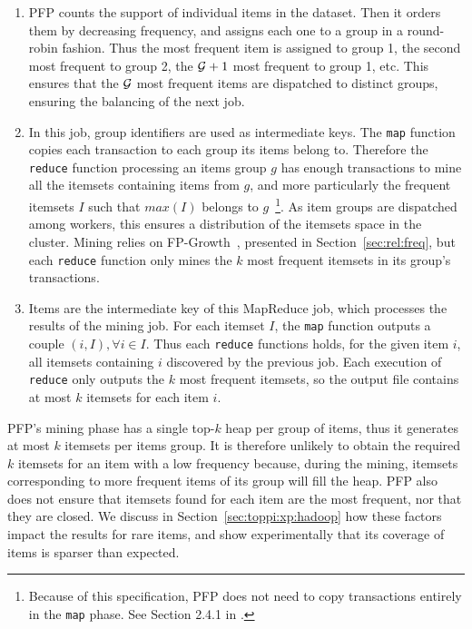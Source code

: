 {
\renewcommand{\labelenumi}{Job \circled{\theenumi}}
\begin{enumerate}
	\leftskip .2in
	\item PFP counts the support of individual items in the dataset.
	Then it orders them by decreasing frequency,
	and assigns each one to a group in a round-robin fashion.
	Thus the most frequent item is assigned to group 1,
	the second most frequent to group 2,
	the ${\cal G}+1$ most frequent to group 1, etc.
	This ensures that the $\cal G$ most frequent items are dispatched to distinct groups,
	ensuring the balancing of the next job.

	\item In this job, group identifiers are used as intermediate keys.
	The \verb|map| function copies each transaction to each group its items belong to.
	Therefore the \verb|reduce| function processing an items group $g$ has enough transactions to mine
	all the itemsets containing items from $g$,
	and more particularly
	the frequent itemsets $I$ such that $\mathit{max}(I)$ belongs to $g$~\footnote{
	Because of this specification, PFP does not need to copy transactions entirely in the \verb|map| phase.
	See Section 2.4.1 in \cite{LiRecSys08}.
	}. As item groups are dispatched among workers,
	this ensures a distribution of the itemsets space in the cluster.
	Mining relies on FP-Growth~\cite{HanSIGMOD00}, presented in Section~\ref{sec:rel:freq},
	but each \verb|reduce| function only mines the $k$ most frequent itemsets in its group's transactions.

	\item Items are the intermediate key of this MapReduce job,
	which processes the results of the mining job.
	For each itemset $I$, the \verb|map| function outputs a couple $(i, I), \forall i \in I$.
	Thus each \verb|reduce| functions holds, for the given item $i$,
	all itemsets containing $i$ discovered by the previous job.
	Each execution of \verb|reduce| only outputs the $k$ most frequent itemsets,
	so the output file contains at most $k$ itemsets for each item $i$.
\end{enumerate}
}

PFP's mining phase has a single top-$k$ heap per group of items,
thus it generates at most $k$ itemsets per items group.
It is therefore unlikely to obtain the required $k$ itemsets for an item with a low frequency because,
during the mining,
itemsets corresponding to more frequent items of its group will fill the heap.
PFP also does not ensure that itemsets found for each item are the most frequent, nor that they are closed.
We discuss in Section~\ref{sec:toppi:xp:hadoop}
how these factors impact the results for rare items,
and show experimentally that its coverage of items is sparser than expected.






